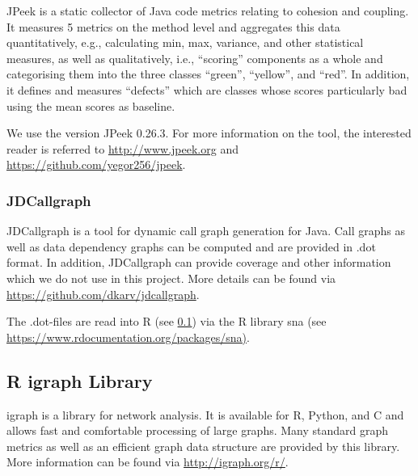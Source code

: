 \documentclass{scrartcl}
\begin{document}
JPeek is a static collector of Java code metrics relating to cohesion and
coupling. It measures 5 metrics on the method level and aggregates this data
quantitatively, e.g., calculating min, max, variance, and other statistical
measures,  as well as qualitatively, i.e., \enquote{scoring} components as a
whole and categorising them into the three classes \enquote{green},
\enquote{yellow}, and \enquote{red}. In addition, it defines and measures
\enquote{defects} which are classes whose scores particularly bad using the mean
scores as baseline.  

We use the version JPeek 0.26.3. For more information on the tool, the
interested reader is referred to \url{http://www.jpeek.org} and
\url{https://github.com/yegor256/jpeek}.

\subsubsection{JDCallgraph}
\label{sec:jdcallgraph}

JDCallgraph is a tool for dynamic call graph generation for Java. Call graphs as
well as data dependency graphs can be computed and are provided in .dot format.
In addition, JDCallgraph can provide coverage and other information which we do
not use in this project. More details can be found via
\url{https://github.com/dkarv/jdcallgraph}.

The .dot-files are read into R (see \ref{sec:igraph}) via the R library sna (see
\url{https://www.rdocumentation.org/packages/sna)}.

\subsection{R igraph Library}
\label{sec:igraph}

igraph is a library for network analysis. It is available for R, Python, and C
and allows fast and comfortable processing of large graphs. Many standard graph
metrics as well as an efficient graph data structure  are provided by this
library. More information can be found via \url{http://igraph.org/r/}.
\end{document}
